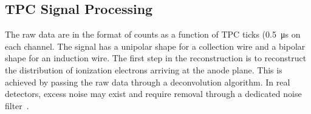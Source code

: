 
\subsection{TPC Signal Processing}\label{sec:tpc_sp}

The raw data are in the format of  counts as a function of TPC ticks (\SI{0.5}{\micro\second} on each channel. The signal has a 
unipolar shape for a collection wire and a bipolar shape for an induction wire. The first step 
in the reconstruction is to reconstruct the distribution of ionization electrons arriving at the anode plane. 
This is achieved by passing the raw data through a deconvolution algorithm. In real detectors, excess 
noise may exist and require removal %
through a dedicated noise filter~\cite{Acciarri:2017sde}. 

